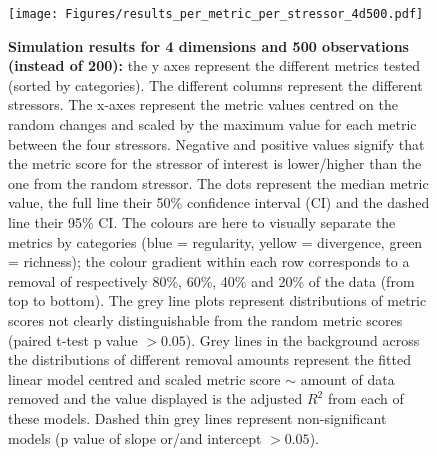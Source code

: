 \documentclass[12pt,letterpaper]{article}
\begin{document}
\begin{figure}[!htbp]
\centering
   \texttt{[image: Figures/results\_per\_metric\_per\_stressor\_4d500.pdf]}
\caption{\scriptsize{\textbf{Simulation results for 4 dimensions and 500 observations (instead of 200):} the y axes represent the different metrics tested (sorted by categories).
The different columns represent the different stressors. The x-axes represent the metric values centred on the random changes and scaled by the maximum value for each metric between the four stressors.
Negative and positive values signify that the metric score for the stressor of interest is lower/higher than the one from the random stressor.
The dots represent the median metric value, the full line their 50\% confidence interval (CI) and the dashed line their 95\% CI.
The colours are here to visually separate the metrics by categories (blue = regularity, yellow = divergence, green = richness); the colour gradient within each row corresponds to a removal of respectively 80\%, 60\%, 40\% and 20\% of the data (from top to bottom).
The grey line plots represent distributions of metric scores not clearly distinguishable from the random metric scores (paired t-test p value $> 0.05$).
Grey lines in the background across the distributions of different removal amounts represent the fitted linear model centred and scaled metric score $\sim$ amount of data removed and the value displayed is the adjusted $R^2$ from each of these models.
Dashed thin grey lines represent non-significant models (p value of slope or/and intercept $> 0.05$).
}}
\label{Fig:simulation_results_4d500}
\end{figure}
\bigskip
\end{document}
